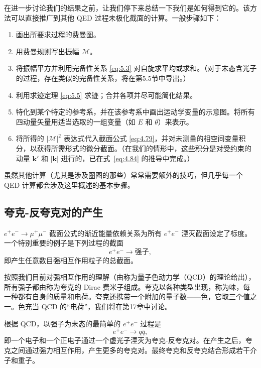 在进一步讨论我们的结果之前，让我们停下来总结一下我们是如何得到它的。该方法可以直接推广到其他 QED 过程未极化截面的计算。一般步骤如下：
\begin{enumerate}
  \item 画出所要求过程的费曼图。
  \item 用费曼规则写出振幅 $\mathcal{M}$。
  \item 将振幅平方并利用完备性关系 \eqref{eq:5.3} 对自旋求平均或求和。（对于末态含光子的过程，存在类似的完备性关系，将在第5.5节中导出。）
  \item 利用求迹定理 \eqref{eq:5.5} 求迹；合并各项并尽可能简化结果。
  \item 特化到某个特定的参考系，并在该参考系中画出运动学变量的示意图。将所有四动量矢量用适当选取的一组变量（如 $E$ 和 $\theta$）来表示。
  \item 将所得的 $|\mathcal{M}|^2$ 表达式代入截面公式 \eqref{eq:4.79}，并对未测量的相空间变量积分，以获得所需形式的微分截面。（在我们的情形中，这些积分是对受约束的动量 $\mathbf{k}'$ 和 $|\mathbf{k}|$ 进行的，已在式~\eqref{eq:4.84} 的推导中完成。）
\end{enumerate}
虽然其他计算（尤其是涉及圈图的那些）常常需要额外的技巧，但几乎每一个 QED 计算都会涉及这里概述的基本步骤。

\subsection{夸克-反夸克对的产生}

$e^{+}e^{-}\to\mu^{+}\mu^{-}$ 截面公式的渐近能量依赖关系为所有 $e^{+}e^{-}$ 湮灭截面设定了标度。一个特别重要的例子是下列过程的截面
\begin{equation}
  e^{+}e^{-} \to \text{强子},
\end{equation}
即产生任意数目强相互作用粒子的总截面。

按照我们目前对强相互作用的理解（由称为量子色动力学（QCD）的理论给出），所有强子都由称为夸克的 Dirac 费米子组成。夸克以各种类型出现，称为味，每一种都有自身的质量和电荷。夸克还携带一个附加的量子数——色，它取三个值之一。色充当 QCD 的``电荷''，我们将在第17章中讨论。

根据 QCD，以强子为末态的最简单的 $e^{+}e^{-}$ 过程是
\begin{equation}
  e^{+}e^{-} \to q\bar{q},
\end{equation}
即一个电子和一个正电子通过一个虚光子湮灭为夸克-反夸克对。在产生之后，夸克之间通过强力相互作用，产生更多的夸克对。最终夸克和反夸克结合形成若干介子和重子。

